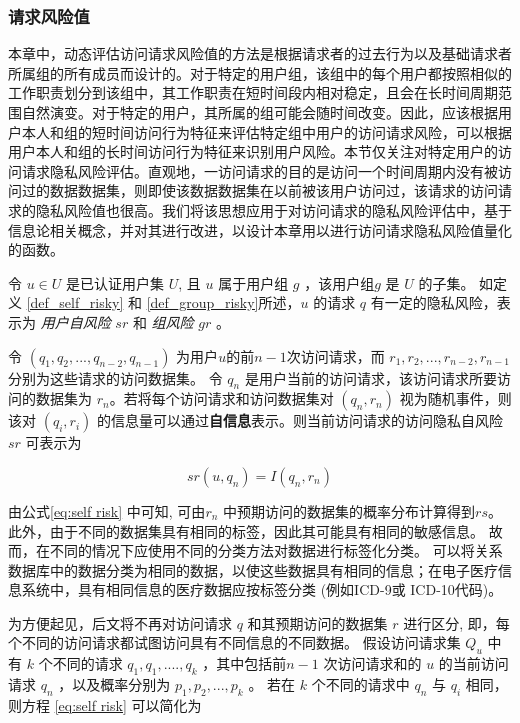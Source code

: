 \subsubsection{请求风险值}
本章中，动态评估访问请求风险值的方法是根据请求者的过去行为以及基础请求者所属组的所有成员而设计的。对于特定的用户组，该组中的每个用户都按照相似的工作职责划分到该组中，其工作职责在短时间段内相对稳定，且会在长时间周期范围自然演变。对于特定的用户，其所属的组可能会随时间改变。因此，应该根据用户本人和组的短时间访问行为特征来评估特定组中用户的访问请求风险，可以根据用户本人和组的长时间访问行为特征来识别用户风险。本节仅关注对特定用户的访问请求隐私风险评估。直观地，一访问请求的目的是访问一个时间周期内没有被访问过的数据数据集，则即使该数据数据集在以前被该用户访问过，该请求的访问请求的隐私风险值也很高。我们将该思想应用于对访问请求的隐私风险评估中，基于信息论相关概念，并对其进行改进，以设计本章用以进行访问请求隐私风险值量化的函数。

令 $u \in U$ 是已认证用户集 $U$, 且 $u$ 属于用户组 $g$ ，该用户组$g$ 是 $U$ 的子集。 如定义 \ref{def_self_risky} 和 \ref{def_group_risky}所述，$u$ 的请求 $q$ 有一定的隐私风险，表示为 \emph{用户自风险} $sr$ 和 \emph{组风险} $gr$ 。

令 $(q_1, q_2, ... , q_{n-2}, q_{n-1})$ 为用户$u$的前$n-1$次访问请求，而 ${r_1, r_2, ... , r_{n-2}, r_{n-1}}$ 分别为这些请求的访问数据集。 令 $q_n$ 是用户当前的访问请求，该访问请求所要访问的数据集为 $r_n$。若将每个访问请求和访问数据集对 $(q_n,r_n)$ 视为随机事件，则该对 $(q_i,r_i)$ 的信息量可以通过\textbf{自信息}表示。则当前访问请求的访问隐私自风险 $sr$ 可表示为

\begin{equation}
\label{eq:self risk}
sr(u,q_n)=I(q_n,r_n)
\end{equation}

由公式\ref{eq:self risk} 中可知, 可由$r_n$ 中预期访问的数据集的概率分布计算得到$rs$。此外，由于不同的数据集具有相同的标签，因此其可能具有相同的敏感信息。 故而，在不同的情况下应使用不同的分类方法对数据进行标签化分类。 可以将关系数据库中的数据分类为相同的数据，以使这些数据具有相同的信息；在电子医疗信息系统中，具有相同信息的医疗数据应按标签分类 (例如ICD-9或 ICD-10代码)。

为方便起见，后文将不再对访问请求 $q$ 和其预期访问的数据集 $r$ 进行区分, 即，每个不同的访问请求都试图访问具有不同信息的不同数据。 假设访问请求集 $Q_u$ 中有 $k$ 个不同的请求 $q_1,q_1,....,q_k$ ，其中包括前$n-1$ 次访问请求和的 $u$ 的当前访问请求 $q_n$ ，以及概率分别为 $p_1,p_2,...,p_k$ 。 若在 $k$ 个不同的请求中 $q_n$ 与 $q_i$ 相同，则方程 \ref{eq:self risk} 可以简化为

